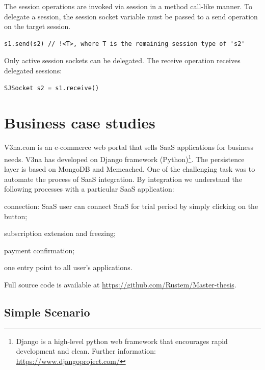\documentclass{llncs}
\begin{document}
The session operations are invoked via session in a method call-like manner. To delegate a session, the session socket variable must be passed to a send operation on the target session.

\begin{lstlisting}
s1.send(s2) // !<T>, where T is the remaining session type of 's2'
\end{lstlisting}


Only active session sockets can be delegated. The receive operation receives delegated sessions:

\begin{lstlisting}
SJSocket s2 = s1.receive()
\end{lstlisting}

\section{Business case studies}
\label{sect:impl}

V3na.com is an e-commerce web portal that sells SaaS applications for business needs. V3na has developed on Django framework (Python)\footnote{ Django is a high-level python web framework that encourages rapid development and clean. Further information: \url{https://www.djangoproject.com/}}. The persistence layer is based on MongoDB and Memcached. One of the challenging task was to automate the process of SaaS integration. By integration we understand the following processes with a particular SaaS application:

\begin{compactitem}
\item  connection: SaaS user can connect SaaS for trial period by simply clicking on the button;

\item  subscription extension and freezing;

\item  payment confirmation;

\item one entry point to all user's applications.
\end{compactitem}
Full source  code is available at \url{https://github.com/Rustem/Master-thesis}.

\subsection{Simple Scenario}
\end{document}
